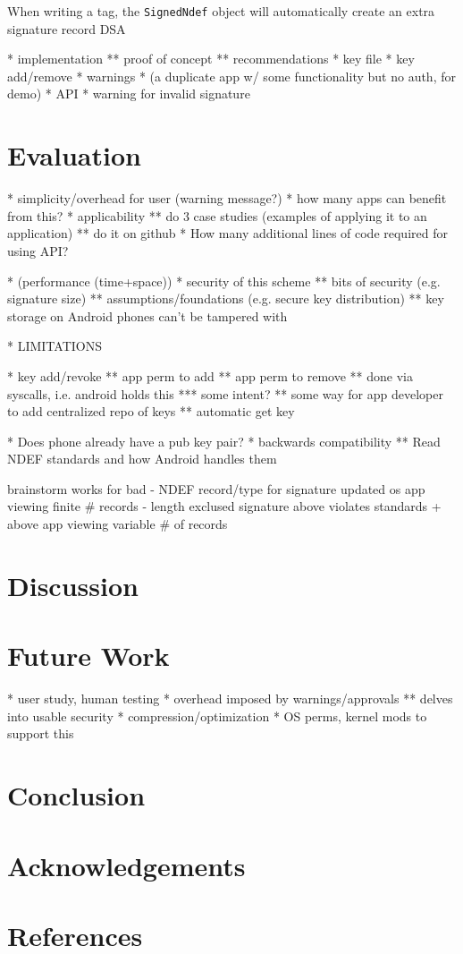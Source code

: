 \documentclass[12pt]{article}
\begin{document}
When writing a tag, the \texttt{SignedNdef} object will automatically create an extra signature record DSA

* implementation
** proof of concept
** recommendations
* key file
* key add/remove
* warnings
* (a duplicate app w/ some functionality but no auth, for demo)
* API
* warning for invalid signature

\section{Evaluation}
* simplicity/overhead for user (warning message?)
* how many apps can benefit from this?
* applicability
** do 3 case studies (examples of applying it to an application)
** do it on github
* How many additional lines of code required for using API?

* (performance (time+space))
* security of this scheme
** bits of security (e.g. signature size)
** assumptions/foundations (e.g. secure key distribution)
** key storage on Android phones can't be tampered with

* LIMITATIONS

* key add/revoke
** app perm to add
** app perm to remove
** done via syscalls, i.e. android holds this
*** some intent?
** some way for app developer to add centralized repo of keys
** automatic get key

* Does phone already have a pub key pair?
* backwards compatibility
** Read NDEF standards and how Android handles them

brainstorm                         works for                           bad
- NDEF record/type for signature   updated os
                                   app viewing finite \# records
- length exclused signature        above                               violates standards
  + above                          app viewing variable \# of records   

\section{Discussion}

\section{Future Work}
* user study, human testing
* overhead imposed by warnings/approvals
** delves into usable security
* compression/optimization
* OS perms, kernel mods to support this

\section{Conclusion}

\section{Acknowledgements}

\section{References}
\end{document}
